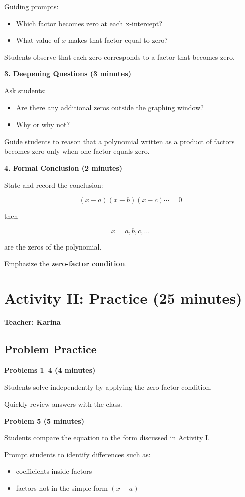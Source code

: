 \documentclass[11pt]{article}
\begin{document}
Guiding prompts:
\begin{itemize}
\item Which factor becomes zero at each x-intercept?
\item What value of $x$ makes that factor equal to zero?
\end{itemize}

Students observe that each zero corresponds to a factor that becomes zero.

\textbf{3. Deepening Questions (3 minutes)}

Ask students:
\begin{itemize}
\item Are there any additional zeros outside the graphing window?
\item Why or why not?
\end{itemize}

Guide students to reason that a polynomial written as a product of factors becomes zero only when one factor equals zero.

\textbf{4. Formal Conclusion (2 minutes)}

State and record the conclusion:

\[
(x-a)(x-b)(x-c)\cdots = 0
\]

then

\[
x = a, b, c, \dots
\]

are the zeros of the polynomial.

Emphasize the \textbf{zero-factor condition}.

\section*{Activity II: Practice (25 minutes)}
\textbf{Teacher: Karina}

\subsection*{Problem Practice}

\textbf{Problems 1--4 (4 minutes)}

Students solve independently by applying the zero-factor condition.

Quickly review answers with the class.

\textbf{Problem 5 (5 minutes)}

Students compare the equation to the form discussed in Activity I.

Prompt students to identify differences such as:
\begin{itemize}
\item coefficients inside factors
\item factors not in the simple form $(x-a)$
\end{itemize}
\end{document}
